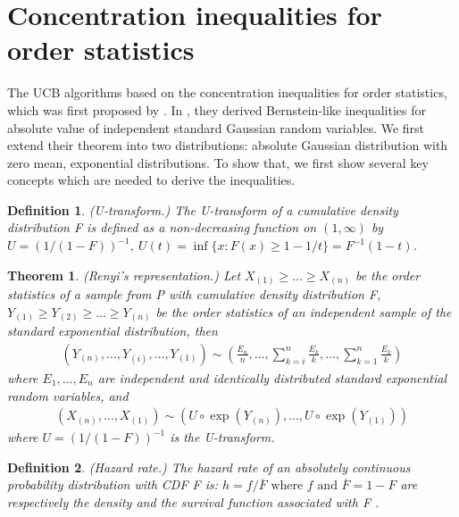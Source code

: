 \documentclass{article}
\theoremstyle{plain}
\newtheorem{theo}{Theorem}
\newtheorem{defi}{Definition}
\begin{document}
\section{Concentration inequalities for order statistics}
The UCB algorithms based on the concentration inequalities for order statistics, which was first proposed by \cite{boucheron2012}. In \cite{boucheron2012}, they derived Bernstein-like inequalities for absolute value of independent standard Gaussian random variables. We first extend their theorem into two distributions: absolute Gaussian distribution with zero mean, exponential distributions. To show that, we first show several key concepts which are needed to derive the inequalities. 


\begin{defi} (U-transform.) The U-transform of a cumulative density distribution F is defined as a non-decreasing function on $(1, \infty)$ by $U = (1/(1-F))^{-1}$, $U(t) = \inf\{x: F(x) \geq 1 - 1/t\} = F^{-1}(1-t)$.
\end{defi}

\begin{theo} (Renyi's representation.) Let $X_{(1)} \geq \ldots \geq X_{(n)}$ be the order statistics of a sample from P with cumulative density distribution F, $Y_{(1)} \geq Y_{(2)} \geq \ldots \geq Y_{(n)}$ be the
order statistics of an independent sample of the standard exponential distribution, then
\begin{align}
    \left(Y_{(n)}, \ldots, Y_{(i)}, \ldots, Y_{(1)}\right) \sim\left(\frac{E_{n}}{n}, \ldots, \sum_{k=i}^{n} \frac{E_{k}}{k}, \ldots, \sum_{k=1}^{n} \frac{E_{k}}{k}\right)
\end{align}
where $E_{1}, \ldots, E_{n}$ are independent and identically distributed standard exponential random variables, and
\begin{align}
    \left(X_{(n)}, \ldots, X_{(1)}\right) \sim\left(U \circ \exp \left(Y_{(n)}\right), \ldots, U \circ \exp \left(Y_{(1)}\right)\right)
\end{align}
where $U=(1 /(1-F))^{-1}$ is the U-transform.
\end{theo}

\begin{defi} (Hazard rate.) The hazard rate of an absolutely continuous probability distribution with CDF F is: $h=f / \overline{F} \text { where } f \text { and } \overline{F}=1-F$ are respectively the density and the survival function associated with F .
\end{defi}
\end{document}
